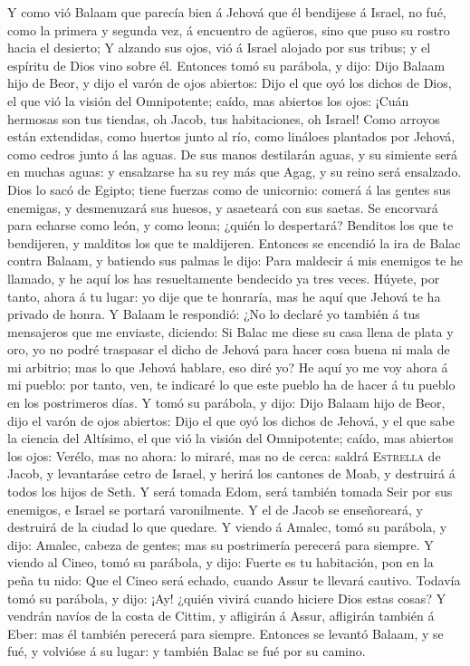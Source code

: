  Y como vió Balaam que parecía bien á Jehová que él
bendijese á Israel, no fué, como la primera y segunda vez, á encuentro
de agüeros, sino que puso su rostro hacia el desierto;  Y
alzando sus ojos, vió á Israel alojado por sus tribus; y el espíritu de
Dios vino sobre él.  Entonces tomó su parábola, y dijo:
Dijo Balaam hijo de Beor, y dijo el varón de ojos abiertos:
 Dijo el que oyó los dichos de Dios, el que vió la visión
del Omnipotente; caído, mas abiertos los ojos:  ¡Cuán
hermosas son tus tiendas, oh Jacob, tus habitaciones, oh Israel!
 Como arroyos están extendidas, como huertos junto al río,
como lináloes plantados por Jehová, como cedros junto á las aguas.
 De sus manos destilarán aguas, y su simiente será en
muchas aguas: y ensalzarse ha su rey más que Agag, y su reino será
ensalzado.  Dios lo sacó de Egipto; tiene fuerzas como de
unicornio: comerá á las gentes sus enemigas, y desmenuzará sus huesos, y
asaeteará con sus saetas.  Se encorvará para echarse como
león, y como leona; ¿quién lo despertará? Benditos los que te
bendijeren, y malditos los que te maldijeren.  Entonces
se encendió la ira de Balac contra Balaam, y batiendo sus palmas le
dijo: Para maldecir á mis enemigos te he llamado, y he aquí los has
resueltamente bendecido ya tres veces.  Húyete, por
tanto, ahora á tu lugar: yo dije que te honraría, mas he aquí que Jehová
te ha privado de honra.  Y Balaam le respondió: ¿No lo
declaré yo también á tus mensajeros que me enviaste, diciendo:
 Si Balac me diese su casa llena de plata y oro, yo no
podré traspasar el dicho de Jehová para hacer cosa buena ni mala de mi
arbitrio; mas lo que Jehová hablare, eso diré yo?  He
aquí yo me voy ahora á mi pueblo: por tanto, ven, te indicaré lo que
este pueblo ha de hacer á tu pueblo en los postrimeros días.
 Y tomó su parábola, y dijo: Dijo Balaam hijo de Beor,
dijo el varón de ojos abiertos:  Dijo el que oyó los
dichos de Jehová, y el que sabe la ciencia del Altísimo, el que vió la
visión del Omnipotente; caído, mas abiertos los ojos: 
Verélo, mas no ahora: lo miraré, mas no de cerca: saldrá
\textsc{Estrella} de Jacob, y levantaráse cetro de Israel, y herirá los
cantones de Moab, y destruirá á todos los hijos de Seth. 
Y será tomada Edom, será también tomada Seir por sus enemigos, e Israel
se portará varonilmente.  Y el de Jacob se enseñoreará, y
destruirá de la ciudad lo que quedare.  Y viendo á
Amalec, tomó su parábola, y dijo: Amalec, cabeza de gentes; mas su
postrimería perecerá para siempre.  Y viendo al Cineo,
tomó su parábola, y dijo: Fuerte es tu habitación, pon en la peña tu
nido:  Que el Cineo será echado, cuando Assur te llevará
cautivo.  Todavía tomó su parábola, y dijo: ¡Ay! ¿quién
vivirá cuando hiciere Dios estas cosas?  Y vendrán navíos
de la costa de Cittim, y afligirán á Assur, afligirán también á Eber:
mas él también perecerá para siempre.  Entonces se
levantó Balaam, y se fué, y volvióse á su lugar: y también Balac se fué
por su camino.

